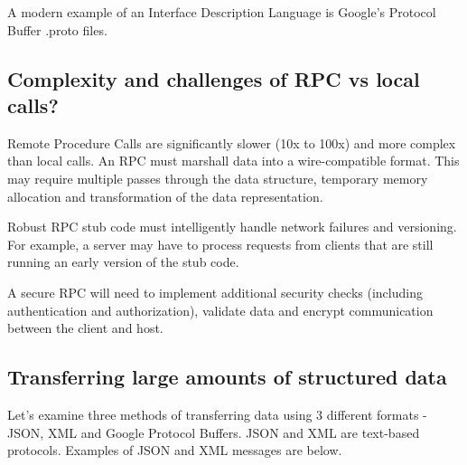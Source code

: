 A modern example of an Interface Description Language is Google's
Protocol Buffer .proto files.

\subsection{Complexity and challenges of RPC vs local
calls?}\label{complexity-and-challenges-of-rpc-vs-local-calls}

Remote Procedure Calls are significantly slower (10x to 100x) and more
complex than local calls. An RPC must marshall data into a
wire-compatible format. This may require multiple passes through the
data structure, temporary memory allocation and transformation of the
data representation.

Robust RPC stub code must intelligently handle network failures and
versioning. For example, a server may have to process requests from
clients that are still running an early version of the stub code.

A secure RPC will need to implement additional security checks
(including authentication and authorization), validate data and encrypt
communication between the client and host.

\subsection{Transferring large amounts of structured
data}\label{transferring-large-amounts-of-structured-data}

Let's examine three methods of transferring data using 3 different
formats - JSON, XML and Google Protocol Buffers. JSON and XML are
text-based protocols. Examples of JSON and XML messages are below.

\begin{Shaded}
\begin{Highlighting}[]
\KeywordTok{>}
\end{Highlighting}
\end{Shaded}

\begin{Shaded}
\begin{Highlighting}[]
\OperatorTok{\{} \OperatorTok{:} \OperatorTok{,} \OperatorTok{:}\OperatorTok{,} \OperatorTok{:} \OperatorTok{\}}
\end{Highlighting}
\end{Shaded}

